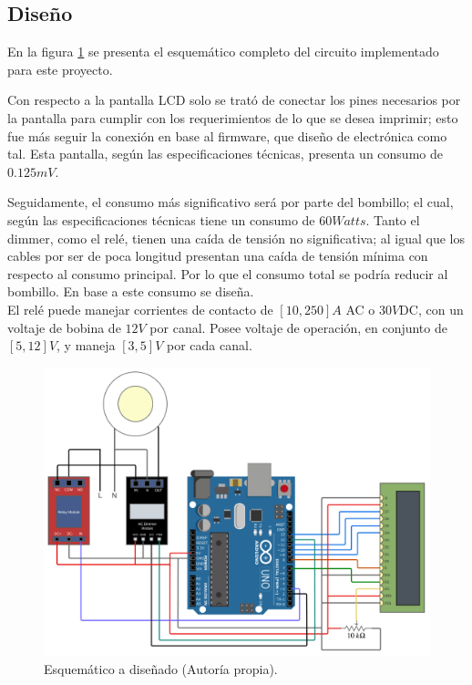 \subsection{Diseño}

En la figura \ref{diseño} se presenta el esquemático completo del circuito implementado para este proyecto.

Con respecto a la pantalla LCD solo se trató de conectar los pines necesarios por la pantalla para cumplir con los requerimientos de lo que se desea imprimir; esto fue más seguir la conexión en base al firmware, que diseño de electrónica como tal. Esta pantalla, según las especificaciones técnicas, presenta un consumo de $0.125\textit{mV}$.

Seguidamente, el consumo más significativo será por parte del bombillo; el cual, según las especificaciones técnicas tiene un consumo de $60 \textit{Watts}$. Tanto el dimmer, como el relé, tienen una caída de tensión no significativa; al igual que los cables por ser de poca longitud presentan una caída de tensión mínima con respecto al consumo principal. Por lo que el consumo total se podría reducir al bombillo. En base a este consumo se diseña. \\
El relé puede manejar corrientes de contacto de $[10, 250]A$ AC o $30V$DC, con un voltaje de bobina de  $12V$ por canal. Posee voltaje de operación, en conjunto de $[5, 12]V$, y maneja $[3, 5]V$ por cada canal.

\begin{figure}[H]
\centering
\includegraphics[scale=0.56]{./images/esquematico_completo.png} 
\caption{Esquemático a diseñado (Autoría propia).}
\label{diseño}
\end{figure}


